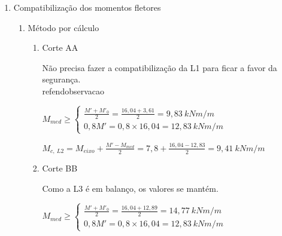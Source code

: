 
\begin{resposta}
    \begin{enumerate}[start=7]
        \item Compatibilização dos momentos fletores

        

        \begin{enumerate}

        \item Método por cálculo

            \begin{enumerate}
                \item Corte AA

                
    
                \begin{observacao}
                    Não precisa fazer a compatibilização da L1 para ficar a favor da segurança.
                \\ref{}end{observacao}
                \end{observacao}
    
                $M_{med} \geq \begin{cases}
                    \frac{M'+M'_{0}}{2} = \frac{16,04+3,61}{2}=9,83 \ kN m/m \\
                    0,8M'=0,8 \times 16,04 = 12,83 \ kN m/m
                \end{cases}$
    
                $M_{c,\ L2}= M_{eixo} + \frac{M'-M_{med}}{2}= 7,8 + \frac{16,04 - 12,83}{2} = 9,41 \ kN m/m$ \newline
                
                \item Corte BB

                
    
                \begin{observacao}
                    Como a L3 é em balanço, os valores se mantém.
                \end{observacao}
    
                $M_{med} \geq \begin{cases}
                    \frac{M'+M'_{0}}{2} = \frac{16,04+12,89}{2}= 14,77 \ kN m/m \\
                    0,8M'=0,8 \times 16,04 = 12,83 \ kN m/m
                \end{cases}$
    

\end{enumerate}
\end{enumerate}
\end{enumerate}
\end{resposta}
